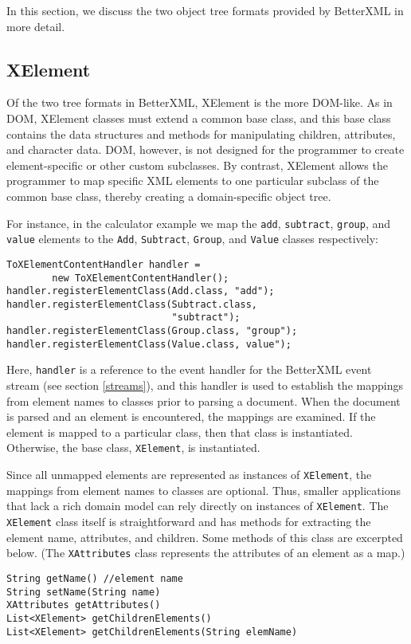 
In this section, we discuss the two object tree formats provided by
BetterXML in more detail.

\subsection{XElement}
Of the two tree formats in BetterXML, XElement is the more DOM-like.
As in DOM, XElement classes must extend a common base class, and this
base class contains the data structures and methods for manipulating
children, attributes, and character data.  DOM, however, is not
designed for the programmer to create element-specific or other custom
subclasses. By contrast, XElement allows the programmer to map
specific XML elements to one particular subclass of the common base
class, thereby creating a domain-specific object tree.

For instance, in the calculator example we map the \lstinline'add',
\lstinline'subtract', \lstinline'group', and \lstinline'value'
elements to the \lstinline'Add', \lstinline'Subtract',
\lstinline'Group', and \lstinline'Value' classes respectively:
\begin{lstlisting}
ToXElementContentHandler handler = 
        new ToXElementContentHandler();  
handler.registerElementClass(Add.class, "add");
handler.registerElementClass(Subtract.class, 
                             "subtract");
handler.registerElementClass(Group.class, "group");
handler.registerElementClass(Value.class, value");  
\end{lstlisting}

Here, \lstinline'handler' is a reference to the event handler for the
BetterXML event stream (see section \ref{streams}), and this handler
is used to establish the mappings from element names to classes prior
to parsing a document. When the document is parsed and an element is
encountered, the mappings are examined.  If the element is mapped to a
particular class, then that class is instantiated.  Otherwise, the
base class, \lstinline'XElement', is instantiated.

Since all unmapped elements are represented as instances of 
\lstinline'XElement', the mappings from element names to classes
are optional.  Thus, smaller applications that lack a rich
domain model can rely directly on instances of \lstinline'XElement'.
The \lstinline'XElement' class itself is straightforward and has
methods for extracting the element name, attributes, and
children. Some methods of this class are excerpted below. (The
\lstinline'XAttributes' class represents the attributes of an element
as a map.)
\begin{lstlisting}
String getName() //element name
String setName(String name) 
XAttributes getAttributes()
List<XElement> getChildrenElements()
List<XElement> getChildrenElements(String elemName)
\end{lstlisting}

